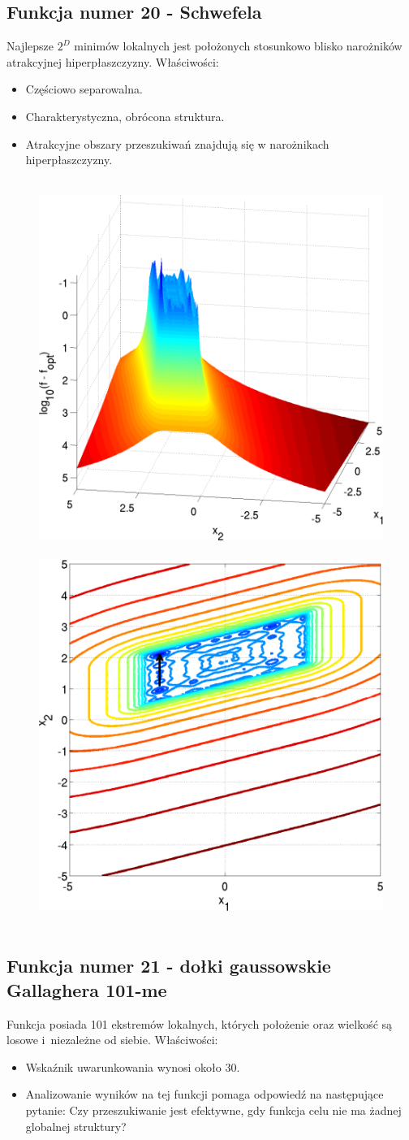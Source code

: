 \documentclass[a4paper,onecolumn,oneside,11pt,wide,floatssmall]{mwrep}
\theoremstyle{definition}
\theoremstyle{plain}%
\theoremstyle{remark}
\begin{document}
\subsection{Funkcja numer 20 - Schwefela}

Najlepsze $2^D$ minimów lokalnych jest położonych stosunkowo blisko narożników atrakcyjnej hiperpłaszczyzny. Właściwości:
\begin{itemize}
 \item Częściowo separowalna.
 \item Charakterystyczna, obrócona struktura.
 \item Atrakcyjne obszary przeszukiwań znajdują się w narożnikach hiperpłaszczyzny.
\end{itemize} 

\begin{figure}[H]
\centering
\mbox{
\includegraphics[width=.45\textwidth]{img/20.png} \quad
\includegraphics[width=.45\textwidth]{img/20a.png} 
}
\end{figure}

\subsection{Funkcja numer 21 - dołki gaussowskie Gallaghera 101-me}

Funkcja posiada 101 ekstremów lokalnych, których położenie oraz wielkość są losowe i~niezależne od siebie.
Właściwości:
\begin{itemize}
 \item Wskaźnik uwarunkowania wynosi około 30.
 \item Analizowanie wyników na tej funkcji pomaga odpowiedź na następujące pytanie: Czy przeszukiwanie jest efektywne, gdy funkcja celu
nie ma żadnej globalnej struktury?
\end{itemize} 
\end{document}
